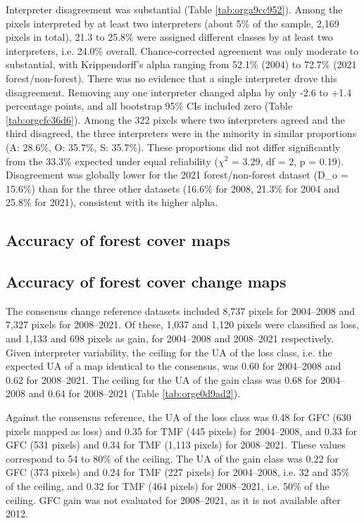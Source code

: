\documentclass[paper=a4, fontsize=12pt, DIV=13, english, dvipsnames]{scrartcl}
\begin{document}
Interpreter disagreement was substantial (Table \ref{tab:orga9cc952}). Among the pixels interpreted by at least two interpreters (about 5\% of the sample, 2,169 pixels in total), 21.3 to 25.8\% were assigned different classes by at least two interpreters, i.e. 24.0\% overall. Chance-corrected agreement was only moderate to substantial, with Krippendorff's alpha ranging from 52.1\% (2004) to 72.7\% (2021 forest/non-forest). There was no evidence that a single interpreter drove this disagreement. Removing any one interpreter changed alpha by only -2.6 to +1.4 percentage points, and all bootstrap 95\% CIs included zero (Table \ref{tab:orgcfc36d6}). Among the 322 pixels where two interpreters agreed and the third disagreed, the three interpreters were in the minority in similar proportions (A: 28.6\%, O: 35.7\%, S: 35.7\%). These proportions did not differ significantly from the 33.3\% expected under equal reliability (\(\chi^2\) = 3.29, df = 2, p = 0.19). Disagreement was globally lower for the 2021 forest/non-forest dataset (D\_o = 15.6\%) than for the three other datasets (16.6\% for 2008, 21.3\% for 2004 and 25.8\% for 2021), consistent with its higher alpha.
\subsection{Accuracy of forest cover maps}
\label{sec:org2270d9b}

\subsection{Accuracy of forest cover change maps}
\label{sec:org1556643}

The consensus change reference datasets included 8,737 pixels for 2004--2008 and 7,327 pixels for 2008--2021. Of these, 1,037 and 1,120 pixels were classified as loss, and 1,133 and 698 pixels as gain, for 2004--2008 and 2008--2021 respectively. Given interpreter variability, the ceiling for the UA of the loss class, i.e. the expected UA of a map identical to the consensus, was 0.60 for 2004--2008 and 0.62 for 2008--2021. The ceiling for the UA of the gain class was 0.68 for 2004--2008 and 0.64 for 2008--2021 (Table \ref{tab:orge0d9ad2}).

Against the consensus reference, the UA of the loss class was 0.48 for GFC (630 pixels mapped as loss) and 0.35 for TMF (445 pixels) for 2004--2008, and 0.33 for GFC (531 pixels) and 0.34 for TMF (1,113 pixels) for 2008--2021. These values correspond to 54 to 80\% of the ceiling. The UA of the gain class was 0.22 for GFC (373 pixels) and 0.24 for TMF (227 pixels) for 2004--2008, i.e. 32 and 35\% of the ceiling, and 0.32 for TMF (464 pixels) for 2008--2021, i.e. 50\% of the ceiling. GFC gain was not evaluated for 2008--2021, as it is not available after 2012.
\end{document}
